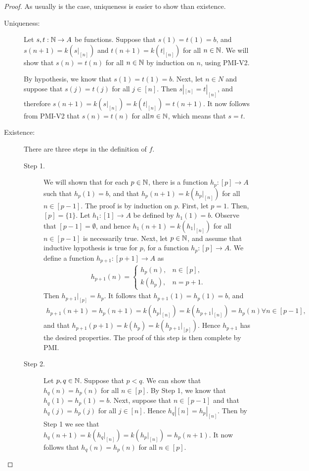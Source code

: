 \documentclass[a4paper,english,12pt]{article}
\begin{document}
\begin{proof} As usually is the case, uniqueness is easier to show than existence.
\begin{description}
	\item[Uniqueness:] Let $s,t : \mathbb{N} \to A$ be functions. Suppose that $s(1) = t(1) = b$, and $s(n + 1) = k(s|_{[n]})$ and $t(n + 1) = k(t|_{[n]})$ for all $n \in \mathbb{N}$. We will show that $s(n) = t(n)$ for all $n \in \mathbb{N}$ by induction on $n$, using PMI-V2. 
	
By hypothesis, we know that $s(1) = t(1) = b$. Next, let $n \in N$ and suppose that $s(j) = t(j)$ for all $j \in [n]$. Then $s|_{[n]} = t|_{[n]}$, and therefore $s(n + 1) = k(s|_{[n]}) = k(t|_{[n]}) = t(n + 1)$. It now follows from PMI-V2 that $s(n) = t(n)$ for all$ n \in \mathbb{N}$, which means that $s = t$. 
	\item[Existence:] There are three steps in the definition of $f$.
\begin{description}
	\item[Step 1.] We will shown that for each $p \in \mathbb{N}$, there is a function $h_p : [p] \to A$ such that $h_p(1)=b$, and that $h_p(n + 1) = k(h_p |_{[n]})$ for all $n \in [p-1]$. The proof is by induction on $p$. First, let $p=1$. Then, $[p] = \{1\}$. Let $h_1 : [1]\to A$ be defined by $h_1(1) = b$. Observe that $[p-1] = \emptyset$, and hence $h_1 (n + 1) = k(h_1 |_{[n]})$ for all $n\in [p-1]$ is necessarily true. Next, let $p \in \mathbb{N}$, and assume that inductive hypothesis is true for $p$, for a function $h_p: [p] \to A$. We define a function $h_{p+1}: [p+1] \to A$ as%
\begin{align*}
h_{p+1}(n)= \begin{cases}
h_p(n),  &n \in [p],\\ 
k(h_p),  &n=p+1. 
\end{cases}
\end{align*}
Then $h_{p+1} |_{[p]} = h_p$. It follows that $h_{p+1}(1) = h_p(1)=b$, and 
\begin{align*}
h_{p+1}(n + 1) = h_p(n+1) = k(h_p|_{[n]})=k(h_{p+1}|_{[n]}) = h_p(n) \forall n \in [p-1],
\end{align*}
and that $h_{p+1}(p+1) = k(h_p) = k(h_{p+1}|_{[p]})$. Hence $h_{p+1}$ has the desired properties. The proof of this step is then complete by PMI.
	\item[Step 2.] Let $p,q \in \mathbb{N}$. Suppose that $p < q$. We can show that $h_q(n) = h_p(n)$ for all $n\in [p]$. By Step 1, we know that $h_q(1) = h_p(1) = b$. Next, suppose that $n\in [p-1]$ and that $h_q(j)=h_p(j)$ for all $j \in [n].$ Hence $h_q|[n] = h_p |_{[n]}$. Then by Step 1 we see that $h_q(n+1)=k(h_q |_{[n]})=k(h_p |_{[n]})=h_p(n+1)$. It now follows that $h_q(n)=h_p(n)$ for all $n \in [p]$.

\end{description}
\end{description}
\end{proof}
\end{document}
